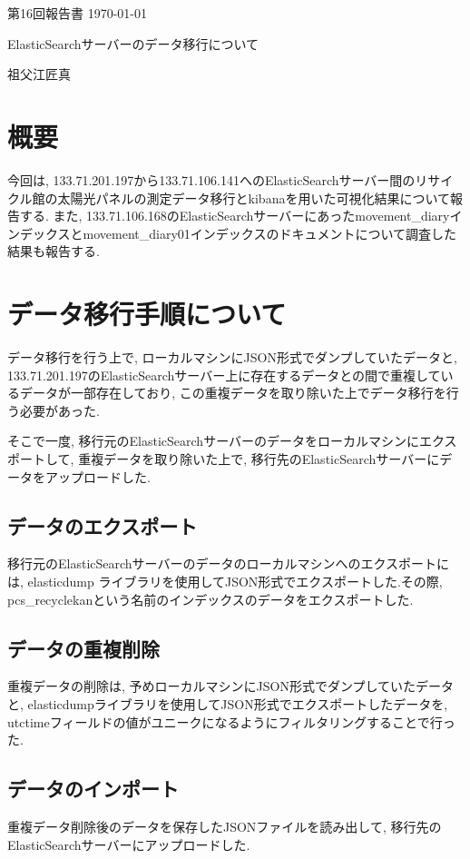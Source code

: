 \documentclass[a4j,12pt,]{jarticle}
\begin{document}
{\noindent\small 第16回報告書 \hfill\today}
\begin{center}
  {\Large ElasticSearchサーバーのデータ移行について}
\end{center}
\begin{flushright}
  祖父江匠真 \\
\end{flushright}

\section{概要}
今回は, 133.71.201.197から133.71.106.141へのElasticSearchサーバー間のリサイクル館の太陽光パネルの測定データ移行とkibanaを用いた可視化結果について報告する.
また, 133.71.106.168のElasticSearchサーバーにあったmovement\_diaryインデックスとmovement\_diary01インデックスのドキュメントについて調査した結果も報告する.

\section{データ移行手順について}

データ移行を行う上で, ローカルマシンにJSON形式でダンプしていたデータと, 133.71.201.197のElasticSearchサーバー上に存在するデータとの間で重複しているデータが一部存在しており, この重複データを取り除いた上でデータ移行を行う必要があった.

そこで一度, 移行元のElasticSearchサーバーのデータをローカルマシンにエクスポートして, 重複データを取り除いた上で, 移行先のElasticSearchサーバーにデータをアップロードした.

\subsection{データのエクスポート}
移行元のElasticSearchサーバーのデータのローカルマシンへのエクスポートには, elasticdump \cite{1}ライブラリを使用してJSON形式でエクスポートした.その際, pcs\_recyclekanという名前のインデックスのデータをエクスポートした.

\subsection{データの重複削除}
重複データの削除は, 予めローカルマシンにJSON形式でダンプしていたデータと, elasticdumpライブラリを使用してJSON形式でエクスポートしたデータを, utctimeフィールドの値がユニークになるようにフィルタリングすることで行った.

\subsection{データのインポート}
重複データ削除後のデータを保存したJSONファイルを読み出して, 移行先のElasticSearchサーバーにアップロードした.
\end{document}
